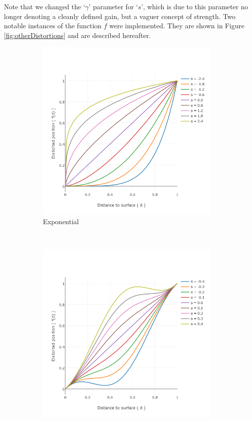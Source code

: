 Note that we changed the `$\gamma $' parameter for `$s$', which is due to this parameter no longer denoting a cleanly defined gain, but a vaguer concept of strength. Two notable instances of the function $f$ were implemented. They are shown in Figure \ref{fig:otherDistortions} and are described hereafter.

\begin{figure}[h]
    \centering
    \begin{subfigure}[b]{.45\textwidth}
        \includegraphics[width=\textwidth]{Figures/exponential_distortion.png}
        \caption{Exponential}
        \label{fig:otherDistortionsExp}
    \end{subfigure}
    ~
    \begin{subfigure}[b]{.45\textwidth}
        \includegraphics[width=\textwidth]{Figures/cosine_distortion.png}

\end{subfigure}
\end{figure}
